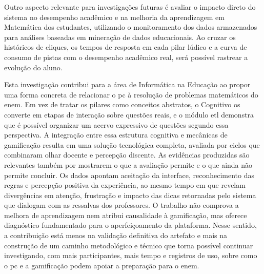 Outro aspecto relevante para investigações futuras é avaliar o impacto direto do
sistema no desempenho acadêmico e na melhoria da aprendizagem em Matemática dos
estudantes, utilizando o monitoramento dos dados armazenados para análises
baseadas em mineração de dados educacionais. Ao cruzar os históricos de cliques,
os tempos de resposta em cada pilar lúdico e a curva de consumo de pistas com o
desempenho acadêmico real, será possível rastrear a evolução do aluno.

Esta investigação contribui para a área de Informática na Educação ao propor uma forma concreta de relacionar o \gls{pc} à resolução de problemas matemáticos do \gls{enem}. Em vez de tratar os pilares como conceitos abstratos, o Cognitivo os converte em etapas de interação sobre questões reais, e o módulo \gls{etl} demonstra que é possível organizar um acervo expressivo de questões segundo essa perspectiva. A integração entre essa estrutura cognitiva e mecânicas de gamificação resulta em uma solução tecnológica completa, avaliada por ciclos que combinaram olhar docente e percepção discente. As evidências produzidas são relevantes também por mostrarem o que a avaliação permite e o que ainda não permite concluir. Os dados apontam aceitação da interface, reconhecimento das regras e percepção positiva da experiência, ao mesmo tempo em que revelam divergências em atenção, frustração e impacto das dicas retornadas pelo sistema que dialogam com as ressalvas dos professores. O trabalho não comprova a melhora de aprendizagem nem atribui causalidade à gamificação, mas oferece diagnóstico fundamentado para o aperfeiçoamento da plataforma. Nesse sentido, a contribuição está menos na validação definitiva do artefato e mais na construção de um caminho metodológico e técnico que torna possível continuar investigando, com mais participantes, mais tempo e registros de uso, sobre como o \gls{pc} e a gamificação podem apoiar a preparação para o \gls{enem}.
